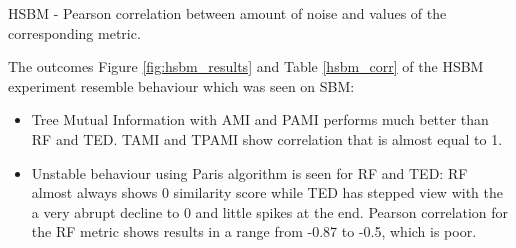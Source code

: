 \begin{table}[H]
	\begin{center}
		\caption{HSBM - Pearson correlation between amount of noise and values of the corresponding metric. \label{hsbm_corr}}
		
	\end{center}
\end{table}


The outcomes Figure \ref{fig:hsbm_results} and Table \ref{hsbm_corr} of the HSBM experiment resemble behaviour which was seen on SBM: 

\begin{itemize}
	\item Tree Mutual Information with AMI and PAMI performs much better than RF and TED. TAMI and TPAMI show correlation that is almost equal to 1.
	\item Unstable behaviour using Paris algorithm is seen for RF and TED: RF almost always shows 0 similarity score while TED has stepped view with the a very abrupt decline to 0 and little spikes at the end. Pearson correlation for the RF metric shows results in a range from -0.87 to -0.5, which is poor.
\end{itemize} 


